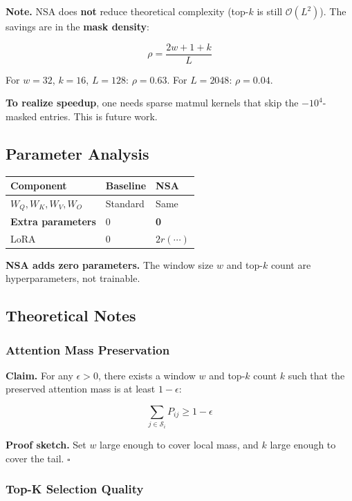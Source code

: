 \textbf{Note.} NSA does \textbf{not} reduce theoretical complexity (top-$k$ is still 
$\mathcal{O}(L^2)$). The savings are in the \textbf{mask density}:

\[
\rho = \frac{2w + 1 + k}{L}
\tag{4.9}
\]

For $w = 32$, $k = 16$, $L = 128$: $\rho = 0.63$.
For $L = 2048$: $\rho = 0.04$.

\textbf{To realize speedup}, one needs sparse matmul kernels that skip the 
$-10^4$-masked entries. This is future work.

\subsection{Parameter Analysis}

\begin{table}[H]
\centering
\small
\begin{tabular}{lll}
\toprule
\textbf{Component} & \textbf{Baseline} & \textbf{NSA} \\
\midrule
$W_Q, W_K, W_V, W_O$ & Standard & Same \\
\textbf{Extra parameters} & 0 & \textbf{0} \\
LoRA & 0 & $2 r (\cdots)$ \\
\bottomrule
\end{tabular}
\end{table}

\textbf{NSA adds zero parameters.} The window size $w$ and top-$k$ count are 
hyperparameters, not trainable.

\subsection{Theoretical Notes}

\subsubsection{Attention Mass Preservation}

\textbf{Claim.} For any $\epsilon > 0$, there exists a window $w$ and top-$k$ 
count $k$ such that the preserved attention mass is at least $1 - \epsilon$:

\[
\sum_{j \in \mathcal{S}_i} P_{ij} \geq 1 - \epsilon
\tag{4.10}
\]

\textbf{Proof sketch.} Set $w$ large enough to cover local mass, and $k$ large 
enough to cover the tail. $\square$

\subsubsection{Top-K Selection Quality}

